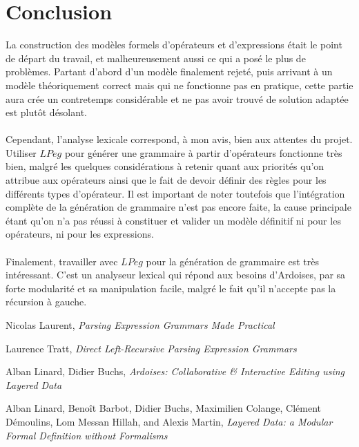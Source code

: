 \documentclass{article}
\begin{document}
\section{Conclusion}
La construction des modèles formels d'opérateurs et d'expressions était le point de départ du travail, et malheureusement aussi ce qui a posé le plus de problèmes. Partant d'abord d'un modèle finalement rejeté, puis arrivant à un modèle théoriquement correct mais qui ne fonctionne pas en pratique, cette partie aura crée un contretemps considérable et ne pas avoir trouvé de solution adaptée est plutôt désolant.
\ \\ \\
Cependant, l'analyse lexicale correspond, à mon avis, bien aux attentes du projet. Utiliser $LPeg$ pour générer une grammaire à partir d'opérateurs fonctionne très bien, malgré les quelques considérations à retenir quant aux priorités qu'on attribue aux opérateurs ainsi que le fait de devoir définir des règles pour les différents types d'opérateur. Il est important de noter toutefois que l'intégration complète de la génération de grammaire n'est pas encore faite, la cause principale étant qu'on n'a pas réussi à constituer et valider un modèle définitif ni pour les opérateurs, ni pour les expressions.
\ \\ \\
Finalement, travailler avec $LPeg$ pour la génération de grammaire est très intéressant. C'est un analyseur lexical qui répond aux besoins d'Ardoises, par sa forte modularité et sa manipulation facile, malgré le fait qu'il n'accepte pas la récursion à gauche.


\renewcommand\refname{Références}
\begin{thebibliography}{9}
	Nicolas Laurent,
	\emph{Parsing Expression Grammars Made Practical}
	
	Laurence Tratt,
	\emph{Direct Left-Recursive Parsing Expression Grammars}
	
	Alban Linard, Didier Buchs,
	\emph{Ardoises:	Collaborative \& Interactive Editing using Layered Data}
	
	Alban Linard, Benoît Barbot, Didier Buchs, Maximilien Colange,
	Clément Démoulins, Lom Messan Hillah, and Alexis Martin,
	\emph{Layered Data: a Modular Formal Definition	without Formalisms}
	
\end{thebibliography}
\end{document}
